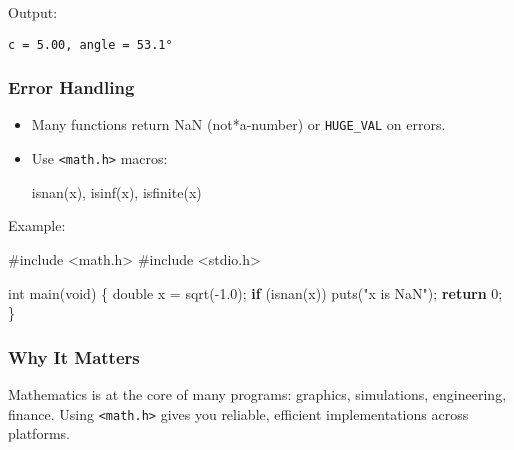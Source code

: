 \documentclass[
  letterpaper,
  DIV=11,
  numbers=noendperiod]{scrreprt}
\newenvironment{Shaded}{\begin{snugshade}}{\end{snugshade}}
\newcommand{\ControlFlowTok}[1]{\textcolor[rgb]{0.00,0.23,0.31}{\textbf{#1}}}
\newcommand{\DataTypeTok}[1]{\textcolor[rgb]{0.68,0.00,0.00}{#1}}
\newcommand{\DecValTok}[1]{\textcolor[rgb]{0.68,0.00,0.00}{#1}}
\newcommand{\FloatTok}[1]{\textcolor[rgb]{0.68,0.00,0.00}{#1}}
\newcommand{\ImportTok}[1]{\textcolor[rgb]{0.00,0.46,0.62}{#1}}
\newcommand{\NormalTok}[1]{\textcolor[rgb]{0.00,0.23,0.31}{#1}}
\newcommand{\OperatorTok}[1]{\textcolor[rgb]{0.37,0.37,0.37}{#1}}
\newcommand{\PreprocessorTok}[1]{\textcolor[rgb]{0.68,0.00,0.00}{#1}}
\newcommand{\StringTok}[1]{\textcolor[rgb]{0.13,0.47,0.30}{#1}}
\begin{document}
Output:

\begin{verbatim}
c = 5.00, angle = 53.1°
\end{verbatim}

\subsubsection{Error Handling}\label{error-handling}

\begin{itemize}
\item
  Many functions return NaN (not*a-number) or \texttt{HUGE\_VAL} on
  errors.
\item
  Use \texttt{\textless{}math.h\textgreater{}} macros:

\begin{Shaded}
\begin{Highlighting}[]
\NormalTok{isnan}\OperatorTok{(}\NormalTok{x}\OperatorTok{),}\NormalTok{ isinf}\OperatorTok{(}\NormalTok{x}\OperatorTok{),}\NormalTok{ isfinite}\OperatorTok{(}\NormalTok{x}\OperatorTok{)}
\end{Highlighting}
\end{Shaded}
\end{itemize}

Example:

\begin{Shaded}
\begin{Highlighting}[]
\PreprocessorTok{\#include }\ImportTok{\textless{}math.h\textgreater{}}
\PreprocessorTok{\#include }\ImportTok{\textless{}stdio.h\textgreater{}}

\DataTypeTok{int}\NormalTok{ main}\OperatorTok{(}\DataTypeTok{void}\OperatorTok{)} \OperatorTok{\{}
    \DataTypeTok{double}\NormalTok{ x }\OperatorTok{=}\NormalTok{ sqrt}\OperatorTok{({-}}\FloatTok{1.0}\OperatorTok{);}
    \ControlFlowTok{if} \OperatorTok{(}\NormalTok{isnan}\OperatorTok{(}\NormalTok{x}\OperatorTok{))}\NormalTok{ puts}\OperatorTok{(}\StringTok{"x is NaN"}\OperatorTok{);}
    \ControlFlowTok{return} \DecValTok{0}\OperatorTok{;}
\OperatorTok{\}}
\end{Highlighting}
\end{Shaded}

\subsubsection{Why It Matters}\label{why-it-matters-51}

Mathematics is at the core of many programs: graphics, simulations,
engineering, finance. Using \texttt{\textless{}math.h\textgreater{}}
gives you reliable, efficient implementations across platforms.
\end{document}
